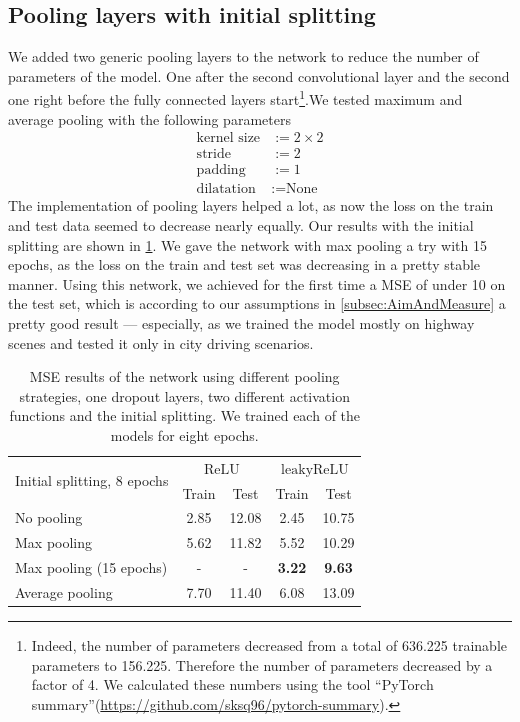 \documentclass[conference]{IEEEtran}
\begin{document}
\subsection{Pooling layers with initial splitting}
We added two generic pooling layers to the network to reduce the number of parameters of the model. One after the second 
convolutional layer and the second one right before the fully connected layers start\footnote{Indeed, the number of 
parameters decreased from a total of 636.225 trainable parameters to 156.225. Therefore the number of parameters decreased by a 
factor of 4. We calculated these numbers using the tool \enquote{PyTorch summary}(\url{https://github.com/sksq96/pytorch-summary}).}.We tested maximum and average pooling with the following 
parameters
\begin{align*}
\text{kernel size} &:= 2\times 2\\
\text{stride} &:= 2\\
\text{padding} &:= 1\\
\text{dilatation} &:= \text{None}
\end{align*}
The implementation of pooling layers helped a lot, as now the loss on the train and test data seemed to decrease 
nearly equally. Our results with the initial splitting are shown in \cref{tab:ResultsInitialSplitting}. We gave the network
with max pooling a try with 15 epochs, as the loss on the train and test set was decreasing in a pretty stable manner. Using this
network, we achieved for the first time a MSE of under 10 on the test set, which is according to our assumptions in \cref{subsec:AimAndMeasure} a 
pretty good result --- especially, as we trained the model mostly on highway scenes and tested it only in city driving scenarios.
\begin{table}[!t]
\normalsize
\centering
\begin{tabular}{lcccc}
\toprule
\multirow{2}{*}{Initial splitting, 8 epochs}  & \multicolumn{2}{c}{$\mathrm{ReLU}$} & \multicolumn{2}{c}{$\mathrm{leakyReLU}$} \\
 & Train & Test & Train & Test\\
\midrule
No pooling & 2.85 & 12.08 & 2.45 & 10.75 \\
Max pooling & 5.62 & 11.82 & 5.52 & 10.29 \\
Max pooling (15 epochs) & - & - & \textbf{3.22} & \textbf{9.63} \\
Average pooling & 7.70 & 11.40 & 6.08 & 13.09\\
\bottomrule
\end{tabular}
\caption{MSE results of the network using different pooling strategies, one dropout layers, two different activation functions and 
the initial splitting. We trained each of the models for eight epochs.}
\label{tab:ResultsInitialSplitting}
\end{table}
\end{document}
